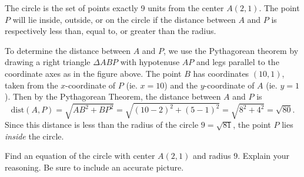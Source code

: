 \documentclass{ximera}
\begin{document}
\begin{explanation}
The circle is the set of points exactly 9 units from the center $A(2,1)$. The point $P$ will lie inside, outside, or on the circle if the distance between $A$ and $P$ is respectively less than, equal to, or greater than the radius.


\begin{onlineOnly}
    \begin{center}
\end{center}
\end{onlineOnly}

To determine the distance between $A$ and $P$, we use the Pythagorean theorem by drawing a right triangle $\Delta ABP$ with hypotenuse $AP$ and legs parallel to the coordinate axes as in the figure above. The point $B$ has coordinates $(10,1)$, taken from the $x$-coordinate of $P$ (ie. $x=10$) and the $y$-coordinate of $A$ (ie. $y=1$). Then by the Pythagorean Theorem, the distance between $A$ and $P$ is
\[
   \text{dist}(A,P) = \sqrt{AB^2 + BP^2} = \sqrt{(10-2)^2 + (5-1)^2} = \sqrt{8^2 + 4^2} = \sqrt{80} . 
\]
Since this distance is less than the radius of the circle $9 = \sqrt{81}$, the point $P$ lies \emph{inside} the circle.

\iffalse   %

\begin{figure}[!h]
\centerline{
\texttt{[image: Circle1.eps]}   
}
\end{figure}

\fi   %


\end{explanation}


\begin{example} \label{Ex2}
Find an equation of the circle with center $A(2,1)$ and radius $9$. Explain your reasoning. Be sure to include an accurate picture.
\end{example}
\end{document}
